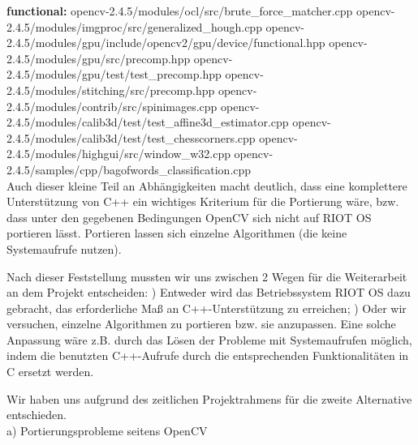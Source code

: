 \documentclass[10pt,a4paper]{article}
\begin{document}
{\bf functional:} \newline
opencv-2.4.5/modules/ocl/src/brute\_force\_matcher.cpp \newline
opencv-2.4.5/modules/imgproc/src/generalized\_hough.cpp \newline
opencv-2.4.5/modules/gpu/include/opencv2/gpu/device/functional.hpp \newline
opencv-2.4.5/modules/gpu/src/precomp.hpp \newline
opencv-2.4.5/modules/gpu/test/test\_precomp.hpp \newline
opencv-2.4.5/modules/stitching/src/precomp.hpp \newline
opencv-2.4.5/modules/contrib/src/spinimages.cpp \newline
opencv-2.4.5/modules/calib3d/test/test\_affine3d\_estimator.cpp \newline
opencv-2.4.5/modules/calib3d/test/test\_chesscorners.cpp \newline
opencv-2.4.5/modules/highgui/src/window\_w32.cpp \newline
opencv-2.4.5/samples/cpp/bagofwords\_classification.cpp \\

Auch dieser kleine Teil an Abhängigkeiten macht deutlich, dass eine komplettere Unterstützung von C++ ein wichtiges Kriterium für die Portierung wäre, bzw. dass unter den gegebenen Bedingungen OpenCV sich nicht auf RIOT OS portieren lässt. Portieren lassen sich einzelne Algorithmen (die keine Systemaufrufe nutzen). \newline

Nach dieser Feststellung mussten wir uns zwischen 2 Wegen für die Weiterarbeit an dem Projekt entscheiden: ) Entweder wird das Betriebssystem RIOT OS dazu gebracht, das erforderliche Maß an C++-Unterstützung zu erreichen; ) Oder wir versuchen, einzelne Algorithmen zu portieren bzw. sie anzupassen. Eine solche Anpassung wäre z.B. durch das Lösen der Probleme mit Systemaufrufen möglich, indem die benutzten C++-Aufrufe durch die entsprechenden Funktionalitäten in C ersetzt werden.\newline

Wir haben uns aufgrund des zeitlichen Projektrahmens für die zweite Alternative entschieden. \\

a) Portierungsprobleme seitens OpenCV \newline
\end{document}

